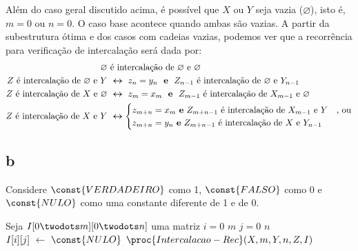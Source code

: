 Além do caso geral discutido acima, é possível que $X$ ou $Y$ seja vazia ($\varnothing$), isto é, $m = 0$ ou $n = 0$. O caso base acontece quando ambas são vazias. A partir da subestrutura ótima e dos casos com cadeias vazias, podemos ver que a recorrência para verificação de intercalação será dada por:
\begin{align*}
    \varnothing &\text{ é intercalação de } \varnothing \text{ e } \varnothing \\
    Z \text{ é intercalação de } \varnothing \text{ e } Y &~\bm{\leftrightarrow}~ z_n = y_n ~\text{ \textbf{e} }~ Z_{n - 1} \text{ é intercalação de } \varnothing \text{ e } Y_{n - 1} \\
    Z \text{ é intercalação de } X \text{ e } \varnothing &~\bm{\leftrightarrow}~ z_m = x_m ~\text{ \textbf{e} }~ Z_{m - 1} \text{ é intercalação de } X_{m - 1} \text{ e } \varnothing \\
    Z \text{ é intercalação de } X \text{ e } Y &~\bm{\leftrightarrow} \begin{cases}
        z_{m + n} = x_m \text{ \textbf{e} } Z_{m + n - 1} \text{ é intercalação de } X_{m - 1} \text{ e } Y &\text{, ou} \\
        z_{m + n} = y_n \text{ \textbf{e} } Z_{m + n - 1} \text{ é intercalação de } X \text{ e } Y_{n - 1}
    \end{cases}
\end{align*}

\itemdsep

\subsection{b} Considere $\const{VERDADEIRO}$ como 1, $\const{FALSO}$ como 0 e $\const{NULO}$ como uma constante diferente de 1 e de 0.

\def\And{\mbox{ \kw{e} }}
\def\Or{\mbox{ \kw{ou} }}

\begin{codebox}
    \li Seja $I[0 \twodots m][0 \twodots n]$ uma matriz
    \li
    \li {} $i = 0$  $m$
        \Do
    \li     {} $j = 0$  $n$
            \Do
    \li         $I[i][j] \gets \const{NULO}$
            \End
        \End
    \li
    \li {} $\proc{Intercalacao-Rec}(X, m, Y, n, Z, I)$
\end{codebox}

